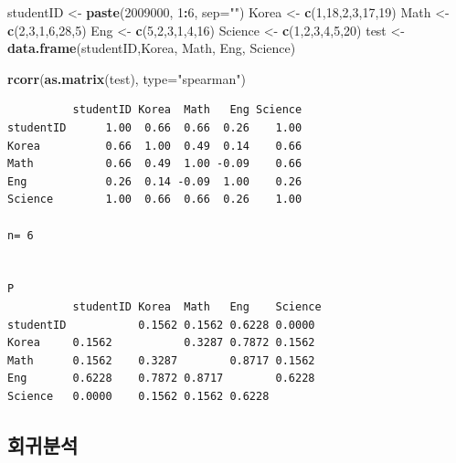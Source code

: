 \documentclass[]{article}
\newenvironment{Shaded}{\begin{snugshade}}{\end{snugshade}}
\newcommand{\KeywordTok}[1]{\textcolor[rgb]{0.13,0.29,0.53}{\textbf{#1}}}
\newcommand{\DataTypeTok}[1]{\textcolor[rgb]{0.13,0.29,0.53}{#1}}
\newcommand{\DecValTok}[1]{\textcolor[rgb]{0.00,0.00,0.81}{#1}}
\newcommand{\StringTok}[1]{\textcolor[rgb]{0.31,0.60,0.02}{#1}}
\newcommand{\OperatorTok}[1]{\textcolor[rgb]{0.81,0.36,0.00}{\textbf{#1}}}
\newcommand{\NormalTok}[1]{#1}
\begin{document}
\begin{Shaded}
\begin{Highlighting}[]
\NormalTok{studentID <-}\StringTok{ }\KeywordTok{paste}\NormalTok{(}\DecValTok{2009000}\NormalTok{, }\DecValTok{1}\OperatorTok{:}\DecValTok{6}\NormalTok{, }\DataTypeTok{sep=}\StringTok{""}\NormalTok{)}
\NormalTok{Korea <-}\StringTok{ }\KeywordTok{c}\NormalTok{(}\DecValTok{1}\NormalTok{,}\DecValTok{18}\NormalTok{,}\DecValTok{2}\NormalTok{,}\DecValTok{3}\NormalTok{,}\DecValTok{17}\NormalTok{,}\DecValTok{19}\NormalTok{)}
\NormalTok{Math <-}\StringTok{ }\KeywordTok{c}\NormalTok{(}\DecValTok{2}\NormalTok{,}\DecValTok{3}\NormalTok{,}\DecValTok{1}\NormalTok{,}\DecValTok{6}\NormalTok{,}\DecValTok{28}\NormalTok{,}\DecValTok{5}\NormalTok{)}
\NormalTok{Eng <-}\StringTok{ }\KeywordTok{c}\NormalTok{(}\DecValTok{5}\NormalTok{,}\DecValTok{2}\NormalTok{,}\DecValTok{3}\NormalTok{,}\DecValTok{1}\NormalTok{,}\DecValTok{4}\NormalTok{,}\DecValTok{16}\NormalTok{)}
\NormalTok{Science <-}\StringTok{ }\KeywordTok{c}\NormalTok{(}\DecValTok{1}\NormalTok{,}\DecValTok{2}\NormalTok{,}\DecValTok{3}\NormalTok{,}\DecValTok{4}\NormalTok{,}\DecValTok{5}\NormalTok{,}\DecValTok{20}\NormalTok{)}
\NormalTok{test <-}\StringTok{ }\KeywordTok{data.frame}\NormalTok{(studentID,Korea, Math, Eng, Science)}

\KeywordTok{rcorr}\NormalTok{(}\KeywordTok{as.matrix}\NormalTok{(test), }\DataTypeTok{type=}\StringTok{"spearman"}\NormalTok{)}
\end{Highlighting}
\end{Shaded}

\begin{verbatim}
          studentID Korea  Math   Eng Science
studentID      1.00  0.66  0.66  0.26    1.00
Korea          0.66  1.00  0.49  0.14    0.66
Math           0.66  0.49  1.00 -0.09    0.66
Eng            0.26  0.14 -0.09  1.00    0.26
Science        1.00  0.66  0.66  0.26    1.00

n= 6 


P
          studentID Korea  Math   Eng    Science
studentID           0.1562 0.1562 0.6228 0.0000 
Korea     0.1562           0.3287 0.7872 0.1562 
Math      0.1562    0.3287        0.8717 0.1562 
Eng       0.6228    0.7872 0.8717        0.6228 
Science   0.0000    0.1562 0.1562 0.6228        
\end{verbatim}

\subsection{회귀분석}
\end{document}
